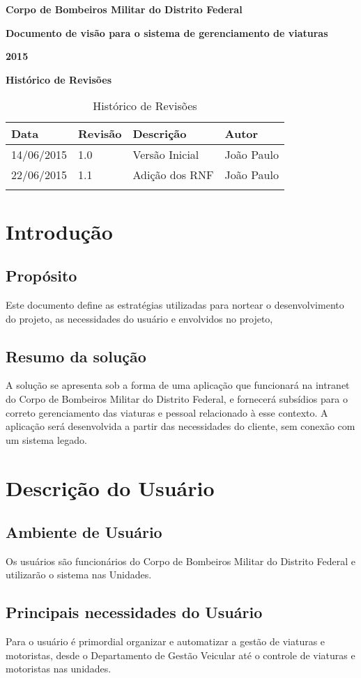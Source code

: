 	{\centering
	\textbf{Corpo de Bombeiros Militar do Distrito Federal}

	\textbf{Documento de visão para o sistema de gerenciamento de viaturas}

	\textbf{2015}

	}
	\textbf{Histórico de Revisões}
	\begin{table}[h]
	\centering
	\label{my-label}
	\begin{tabular}{|l|l|l|l|}
	\hline
	Data & Revisão & Descrição & Autor \\ \hline
	14/06/2015 & 1.0 & Versão Inicial & João Paulo \\ \hline
	22/06/2015 & 1.1 & Adição dos RNF & João Paulo \\ \hline
	     &         &           &       \\ \hline
	\end{tabular}
	\caption{Histórico de Revisões}
	\end{table}
  
	\section{Introdução}
		\subsection{Propósito}
Este documento define as estratégias utilizadas para nortear o desenvolvimento do projeto, 
as necessidades do usuário e envolvidos no projeto,
		\subsection{Resumo da solução}
A solução se apresenta sob a forma de uma aplicação que funcionará na intranet do Corpo de Bombeiros Militar 
do Distrito Federal, e fornecerá subsídios para o correto gerenciamento das viaturas e pessoal relacionado à esse contexto. 
A aplicação será desenvolvida a partir das necessidades do cliente, sem conexão com um sistema legado.
	\section{Descrição do Usuário}
		\subsection{Ambiente de Usuário}
Os usuários são funcionários do Corpo de Bombeiros Militar do Distrito Federal e utilizarão o sistema nas Unidades.
		\subsection{Principais necessidades do Usuário}
Para o usuário é primordial organizar e automatizar a gestão de viaturas e motoristas, 
desde o Departamento de Gestão Veicular até o controle de viaturas e motoristas nas unidades.
